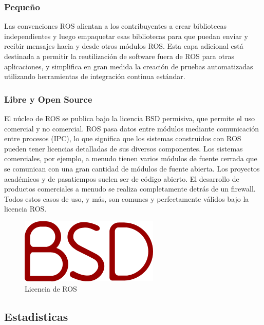 \newpage
            
        \subsubsection{Pequeño}
        
            Las convenciones ROS alientan a los contribuyentes a crear bibliotecas independientes y luego empaquetar esas bibliotecas para que puedan enviar y recibir mensajes hacia y desde otros módulos ROS. Esta capa adicional está destinada a permitir la reutilización de software fuera de ROS para otras aplicaciones, y simplifica en gran medida la creación de pruebas automatizadas utilizando herramientas de integración continua estándar.
            
        \subsubsection{Libre y Open Source}
        
            El núcleo de ROS se publica bajo la licencia BSD permisiva, que permite el uso comercial y no comercial. ROS pasa datos entre módulos mediante comunicación entre procesos (IPC), lo que significa que los sistemas construidos con ROS pueden tener licencias detalladas de sus diversos componentes. Los sistemas comerciales, por ejemplo, a menudo tienen varios módulos de fuente cerrada que se comunican con una gran cantidad de módulos de fuente abierta. Los proyectos académicos y de pasatiempos suelen ser de código abierto. El desarrollo de productos comerciales a menudo se realiza completamente detrás de un firewall. Todos estos casos de uso, y más, son comunes y perfectamente válidos bajo la licencia ROS.
            
            \begin{figure}[htb]
                \centering
                \includegraphics[width=0.3\linewidth]{Main/Chapter3/Images3/3-5/licnecia-bsd-ros.png}
                \caption{Licencia de ROS}
                \label{f:Cap3-5_multilenguaje_ros}
            \end{figure}
            

\newpage

    \subsection{Estadisticas}
    
